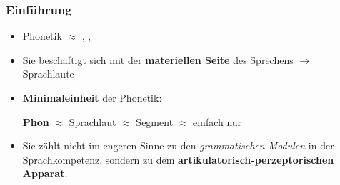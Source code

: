 \begin{frame}
\frametitle{Einführung}

	\begin{itemize}
		\item Phonetik $\approx$ , , 
		\item Sie beschäftigt sich mit der \textbf{materiellen Seite} des Sprechens $\rightarrow$ Sprachlaute 
		\item \textbf{Minimaleinheit} der Phonetik:\par%
                      \textbf{Phon} $\approx$ Sprachlaut $\approx$ Segment $\approx$ einfach nur 
		\item Sie zählt nicht im engeren Sinne zu den \textit{grammatischen Modulen} in der Sprachkompetenz, sondern zu dem \textbf{artikulatorisch-perzeptorischen Apparat}.
	\end{itemize}
	
\end{frame}

